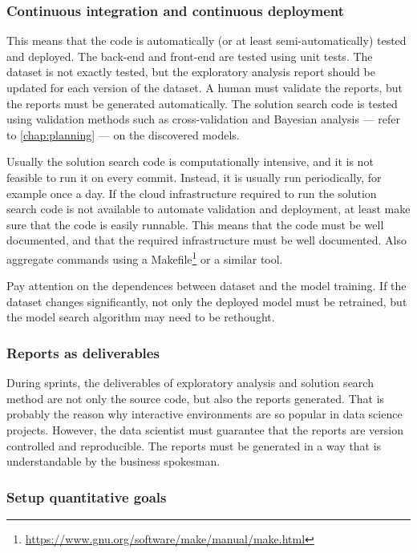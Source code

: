 \subsubsection{Continuous integration and continuous deployment}


This means that the code is
automatically (or at least semi-automatically) tested and deployed.  The back-end and
front-end are tested using unit tests.  The dataset is not exactly tested, but the
exploratory analysis report should be updated for each version of the dataset.
A human must validate the reports, but the reports must be generated automatically.
The solution search code is tested using
validation methods such as cross-validation and Bayesian analysis --- refer to
\cref{chap:planning} --- on the discovered models.

Usually the solution search code is computationally intensive, and it is
not feasible to run it on every commit.  Instead, it is usually run periodically, for example
once a day.  If the cloud infrastructure required to run the solution search code is not
available to automate validation and deployment, at least make sure that the code is
easily runnable.  This means that the code must be well documented, and that the
required infrastructure must be well documented.  Also aggregate commands using a
Makefile\footnote{\url{https://www.gnu.org/software/make/manual/make.html}} or a similar tool.

Pay attention on the dependences between dataset and the
model training.  If the dataset changes significantly, not only the deployed model
must be retrained, but the model search algorithm may need to be rethought.

\subsubsection{Reports as deliverables}

During sprints, the deliverables of exploratory analysis and solution search method are
not only the source code, but also the reports generated.  That is probably the reason why
interactive environments are so popular in data science projects.  However, the data
scientist must guarantee that the reports are version controlled and reproducible.  The
reports must be generated in a way that is understandable by the business spokesman.

\subsubsection{Setup quantitative goals}

